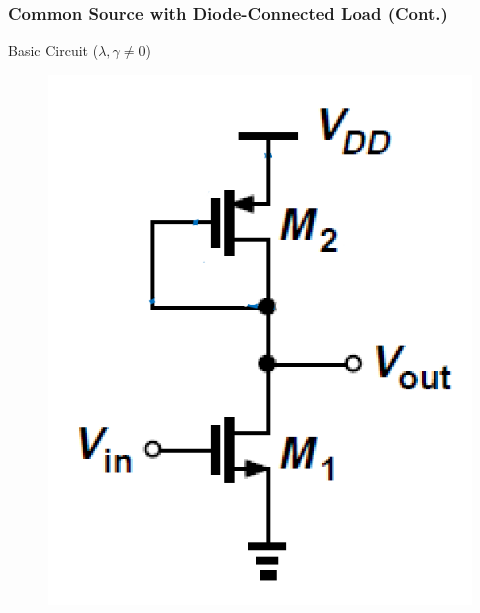 \documentclass{beamer}
\begin{document}
\begin{frame}
    \frametitle{Common Source with Diode-Connected Load (Cont.)}
    \begin{minipage}{0.45\linewidth}
        Basic Circuit ($\lambda, \gamma\not= 0$)
        \begin{figure}[H]
            \centering
            \includegraphics[width=0.8\linewidth]{common-source-D2}
        \end{figure}
         

\end{minipage}
\end{frame}
\end{document}
